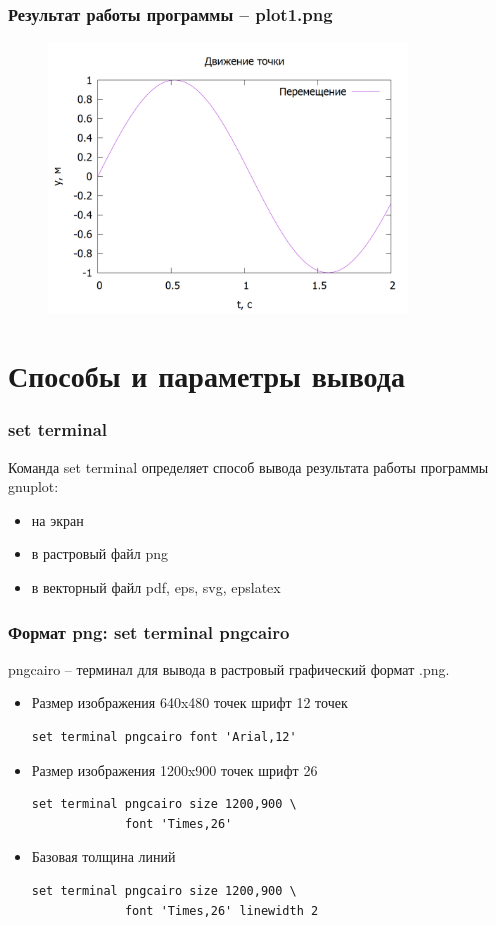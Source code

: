 \documentclass[12pt, compress]{beamer}
\renewcommand{\emph}[1]{\textcolor{dark-blue}{#1}}
\begin{document}
\begin{frame}[c,fragile]
\frametitle{Результат работы программы -- \emph{plot1.png}}
\begin{figure}
  \centering
  \includegraphics[width=0.85\textwidth]{./gp/plot1.png}
\end{figure}
\end{frame}

\section{Способы и параметры вывода}

\begin{frame}[c]
\frametitle{set terminal}
Команда \emph{set terminal} определяет способ вывода результата работы программы \emph{gnuplot}:
\begin{itemize}
  \item на экран
  \item в растровый файл \emph{png}
  \item в векторный файл \emph{pdf}, \emph{eps}, \emph{svg}, \emph{epslatex}
\end{itemize}
\end{frame}


\begin{frame}[c,fragile]
\frametitle{Формат png: \emph{set terminal pngcairo}}
\emph{pngcairo} -- терминал для вывода в растровый графический формат \emph{.png}.

\vspace{10pt}
\begin{itemize}
\item Размер изображения 640x480 точек шрифт 12 точек
\begin{lstlisting}
set terminal pngcairo font 'Arial,12'
\end{lstlisting}
\item Размер изображения 1200x900 точек шрифт 26
\begin{lstlisting}
set terminal pngcairo size 1200,900 \ 
             font 'Times,26'
\end{lstlisting}
\item Базовая толщина линий
\begin{lstlisting}
set terminal pngcairo size 1200,900 \ 
             font 'Times,26' linewidth 2
\end{lstlisting}
\end{itemize}
\end{frame}
\end{document}
